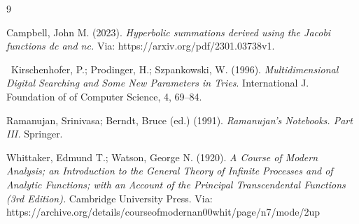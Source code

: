 \documentclass[12pt]{amsart}
\newtheorem{theorem}{Theorem}[section]
\theoremstyle{definition}
\theoremstyle{remark}
\numberwithin{equation}{section}
\newcommand{\1}{\mathbbm{1}}
\newcommand{\E}{{\mathbb E}}
\newcommand{\N}{{\mathbb N}}
\begin{document}
{\begin{thebibliography}{9}


Campbell, John M. (2023). 
\textit{Hyperbolic summations derived using the Jacobi functions dc and nc.}
Via: https://arxiv.org/pdf/2301.03738v1.

\ Kirschenhofer, P.; Prodinger, H.; Szpankowski, W. (1996). \textit{Multidimensional Digital Searching and Some New Parameters in Tries}. International J. Foundation of of Computer Science, 4, 69--84.

Ramanujan, Srinivasa; Berndt, Bruce (ed.) (1991).
\textit{Ramanujan's Notebooks. Part III.}
Springer.

Whittaker, Edmund T.; Watson, George N. (1920).
\textit{A Course of Modern Analysis; an Introduction to the General Theory of Infinite Processes and of Analytic Functions; with an Account of the Principal Transcendental Functions (3rd Edition).}
Cambridge University Press.
Via: https://archive.org/details/courseofmodernan00whit/page/n7/mode/2up

\end{thebibliography}



}
\end{document}
